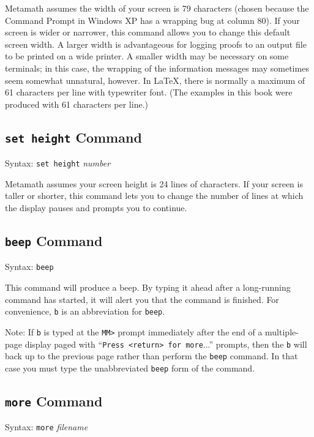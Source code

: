Metamath assumes the width of your screen is 79 characters (chosen
because the Command Prompt in Windows XP has a wrapping bug at column
80).  If your screen is wider or narrower, this command allows you to
change this default screen width.  A larger width is advantageous for
logging proofs to an output file to be printed on a wide printer.  A
smaller width may be necessary on some terminals; in this case, the
wrapping of the information messages may sometimes seem somewhat
unnatural, however.  In \LaTeX{},
there is normally a maximum of 61 characters per line with typewriter
font.  (The examples in this book were produced with 61 characters per
line.)

\subsection{\texttt{set height} Command}
Syntax:  \texttt{set height} {\em number}

Metamath assumes your screen height is 24 lines of characters.  If your
screen is taller or shorter, this command lets you to change the number
of lines at which the display pauses and prompts you to continue.

\subsection{\texttt{beep} Command}

Syntax:  \texttt{beep}

This command will produce a beep.  By typing it ahead after a
long-running command has started, it will alert you that the command is
finished.  For convenience, \texttt{b} is an abbreviation for
\texttt{beep}.

Note:  If \texttt{b} is typed at the \texttt{MM>} prompt immediately
after the end of a multiple-page display paged with ``\texttt{Press
<return> for more}...'' prompts, then the \texttt{b} will back up to the
previous page rather than perform the \texttt{beep} command.
In that case you must type the unabbreviated \texttt{beep} form
of the command.

\subsection{\texttt{more} Command}

Syntax:  \texttt{more} {\em filename}

